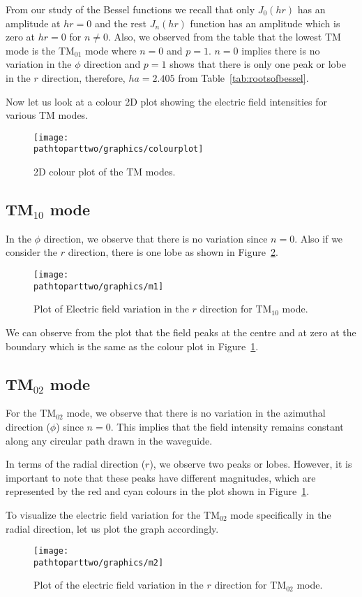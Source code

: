 From our study of the Bessel functions we recall that only $J_0(hr)$ has an amplitude at $hr = 0$ and the rest $J_n(hr)$ function has an amplitude which is zero at $hr = 0$ for $n \ne 0$. Also, we observed from the table that the lowest TM mode is the TM$_{01}$ mode where $n = 0$ and $p = 1$. $n = 0$ implies there is no variation in the $\phi$ direction and $p = 1$ shows that there is only one peak or lobe in the $r$ direction, therefore, $ha = 2.405$ from Table~\ref{tab:rootsofbessel}. 

Now let us look at a colour 2D plot showing the electric field intensities for various TM modes.
\begin{figure}[h]
\centering
\texttt{[image: \\pathtoparttwo/graphics/colourplot]}
\caption{2D colour plot of the TM modes.}
\label{fig:colourplot}
\end{figure}

\subsection{TM$_{10}$ mode}
In the $\phi$ direction, we observe that there is no variation since $n=0$. Also if we consider the $r$ direction, there is one lobe as shown in Figure~\ref{fig:m1}.
\begin{figure}[h]
\centering
\texttt{[image: \\pathtoparttwo/graphics/m1]}
\caption{Plot of Electric field variation in the $r$ direction for TM$_{10}$ mode.}
\label{fig:m1}
\end{figure}

We can observe from the plot that the field peaks at the centre and at zero at the boundary which is the same as the colour plot in Figure~\ref{fig:colourplot}.
   
\subsection{TM$_{02}$ mode}
For the TM$_{02}$ mode, we observe that there is no variation in the azimuthal direction ($\phi$) since $n=0$. This implies that the field intensity remains constant along any circular path drawn in the waveguide.

In terms of the radial direction ($r$), we observe two peaks or lobes. However, it is important to note that these peaks have different magnitudes, which are represented by the red and cyan colours in the plot shown in Figure~\ref{fig:colourplot}. 

To visualize the electric field variation for the TM$_{02}$ mode specifically in the radial direction, let us plot the graph accordingly.
\begin{figure}[h]
\centering
\texttt{[image: \\pathtoparttwo/graphics/m2]}
\caption{Plot of the electric field variation in the $r$ direction for TM$_{02}$ mode.}
\label{fig:m2}
\end{figure}

